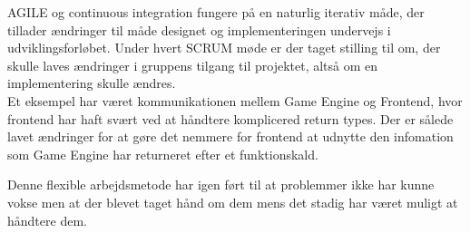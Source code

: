 AGILE og continuous integration fungere på en naturlig iterativ måde, der tillader 
ændringer til måde designet og implementeringen undervejs i udviklingsforløbet.
Under hvert SCRUM møde er der taget stilling til om, der skulle laves ændringer i 
gruppens tilgang til projektet, altså om en implementering skulle ændres. \\

Et eksempel har været kommunikationen mellem Game Engine og Frontend, hvor frontend
har haft svært ved at håndtere komplicered return types. Der er sålede lavet
ændringer for at gøre det nemmere for frontend at udnytte den infomation som Game Engine
har returneret efter et funktionskald.

Denne flexible arbejdsmetode har igen ført til at problemmer ikke har kunne vokse men
at der blevet taget hånd om dem mens det stadig har været muligt at håndtere dem.

